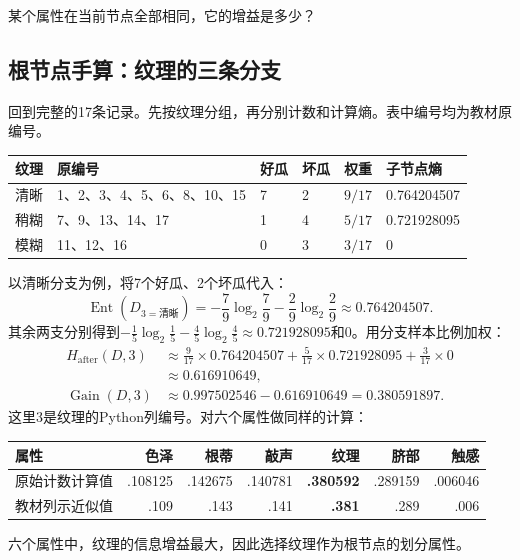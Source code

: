 \documentclass[UTF8,a4paper,11pt,fontset=fandol]{ctexart}
\numberwithin{equation}{subsection}
\begin{document}
\begin{questionbox}[思考题5]
某个属性在当前节点全部相同，它的增益是多少？
\end{questionbox}

\clearpage
\subsection{根节点手算：纹理的三条分支}
回到完整的17条记录。先按纹理分组，再分别计数和计算熵。表中编号均为教材原编号。
\par\noindent\begin{tabularx}{\textwidth}{L{1.15cm}Y C{.9cm}C{.9cm}C{1.25cm}L{2.2cm}}
\toprule
纹理 & 原编号 & 好瓜 & 坏瓜 & 权重 & 子节点熵\\
\midrule
清晰 & 1、2、3、4、5、6、8、10、15 & 7 & 2 & $9/17$ & 0.764204507\\
稍糊 & 7、9、13、14、17 & 1 & 4 & $5/17$ & 0.721928095\\
模糊 & 11、12、16 & 0 & 3 & $3/17$ & 0\\
\bottomrule
\end{tabularx}\par
以清晰分支为例，将7个好瓜、2个坏瓜代入：
\begin{equation}
\operatorname{Ent}(D_{3=\text{清晰}})
=-\frac79\log_2\frac79-\frac29\log_2\frac29
\approx0.764204507.
\end{equation}
其余两支分别得到$-\frac15\log_2\frac15-\frac45\log_2\frac45\approx0.721928095$和0。用分支样本比例加权：
\begin{equation}
\begin{aligned}
H_{\mathrm{after}}(D,3)
&\approx\frac9{17}\times0.764204507
+\frac5{17}\times0.721928095+\frac3{17}\times0\\
&\approx0.616910649,\\
\operatorname{Gain}(D,3)
&\approx0.997502546-0.616910649
=0.380591897.
\end{aligned}
\end{equation}
这里3是纹理的Python列编号。对六个属性做同样的计算：
\begin{center}
\begin{tabular}{lrrrrrr}
\toprule
属性 & 色泽 & 根蒂 & 敲声 & 纹理 & 脐部 & 触感\\
\midrule
原始计数计算值 & .108125 & .142675 & .140781 & \textbf{.380592} & .289159 & .006046\\
教材列示近似值 & .109 & .143 & .141 & \textbf{.381} & .289 & .006\\
\bottomrule
\end{tabular}
\end{center}
\begin{keybox}
六个属性中，纹理的信息增益最大，因此选择纹理作为根节点的划分属性。
\end{keybox}
\end{document}
